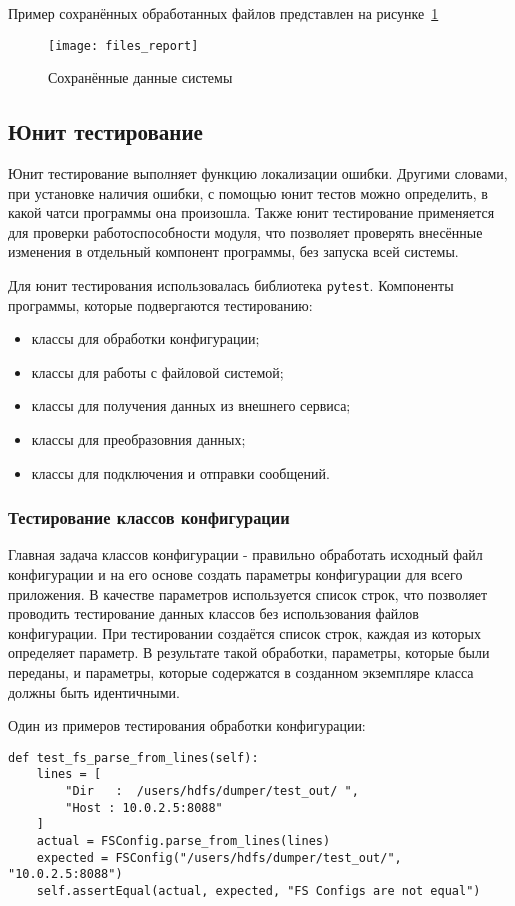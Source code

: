 Пример сохранённых обработанных файлов представлен на рисунке~\ref{pic:lit_testing:files_report}

\begin{figure}
    \centering
    \texttt{[image: files\_report]}
    \caption{Сохранённые данные системы}
    \label{pic:lit_testing:files_report}
\end{figure}

\subsection{Юнит тестирование}
Юнит тестирование выполняет функцию локализации ошибки.
Другими словами, при установке наличия ошибки, с помощью юнит тестов можно определить, в какой чатси программы она произошла.
Также юнит тестирование применяется для проверки работоспособности модуля, что позволяет проверять внесённые изменения в отдельный компонент программы, без запуска всей системы.

Для юнит тестирования использовалась библиотека \texttt{pytest}.
Компоненты программы, которые подвергаются тестированию:
\begin{itemize}
    \item классы для обработки конфигурации;
    \item классы для работы с файловой системой;
    \item классы для получения данных из внешнего сервиса;
    \item классы для преобразовния данных;
    \item классы для подключения и отправки сообщений.
\end{itemize}

\subsubsection{Тестирование классов конфигурации}

Главная задача классов конфигурации - правильно обработать исходный файл конфигурации и на его основе создать параметры конфигурации для всего приложения.
В качестве параметров используется список строк, что позволяет проводить тестирование данных классов без использования файлов конфигурации.
При тестировании создаётся список строк, каждая из которых определяет параметр.
В результате такой обработки, параметры, которые были переданы, и параметры, которые содержатся в созданном экземпляре класса должны быть идентичными.

Один из примеров тестирования обработки конфигурации:
\begin{lstlisting}
def test_fs_parse_from_lines(self):
    lines = [
        "Dir   :  /users/hdfs/dumper/test_out/ ",
        "Host : 10.0.2.5:8088"
    ]
    actual = FSConfig.parse_from_lines(lines)
    expected = FSConfig("/users/hdfs/dumper/test_out/", "10.0.2.5:8088")
    self.assertEqual(actual, expected, "FS Configs are not equal")
\end{lstlisting}

